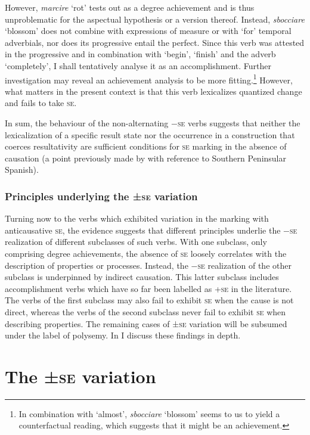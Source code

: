 \documentclass[output=paper,colorlinks,citecolor=brown
]{langscibook}
\begin{document}
However, \textit{marcire} ‘rot’ tests out as a degree achievement and is thus unproblematic for the aspectual hypothesis or a version thereof. Instead, \textit{sbocciare} ‘blossom’ does not combine with expressions of measure or with ‘for’ temporal adverbials, nor does its progressive entail the perfect. Since this verb was attested in the progressive and in combination with ‘begin’, ‘finish’ and the adverb ‘completely’, I shall tentatively analyse it as an accomplishment. Further investigation may reveal an achievement analysis to be more fitting.\footnote{In combination with ‘almost’, \textit{sbocciare} ‘blossom’ seems to us to yield a counterfactual reading, which suggests that it might be an achievement.} However, what matters in the present context is that this verb lexicalizes quantized change and fails to take \textsc{se}.

In sum, the behaviour of the non-alternating −\textsc{se} verbs suggests that neither the lexicalization of a specific result state nor the occurrence in a construction that coerces resultativity are sufficient conditions for \textsc{se} marking in the absence of causation (a point previously made by \citet{jimenez2017causativity} with reference to Southern Peninsular Spanish).  

\subsubsection{Principles underlying the ±\textsc{se} variation}
\label{bentley_section_3.3.3}
Turning now to the verbs which exhibited variation in the marking with anticausative \textsc{se}, the evidence suggests that different principles underlie the −\textsc{se} realization of different subclasses of such verbs. With one subclass, only comprising degree achievements, the absence of \textsc{se} loosely correlates with the description of properties or processes. Instead, the −\textsc{se} realization of the other subclass is underpinned by indirect causation. This latter subclass includes accomplishment verbs which have so far been labelled as +\textsc{se} in the literature. The verbs of the first subclass may also fail to exhibit \textsc{se} when the cause is not direct, whereas the verbs of the second subclass never fail to exhibit \textsc{se} when describing properties. The remaining cases of ±\textsc{se} variation will be subsumed under the label of polysemy. In  I discuss these findings in depth.

\section{The ±\textsc{se} variation}
\label{bentley_section_4}
\end{document}
